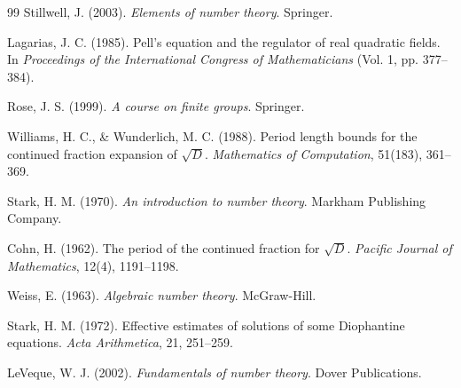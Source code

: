 \documentclass[12pt]{article}
\begin{document}
\begin{thebibliography}{99}
Stillwell, J. (2003). \emph{Elements of number theory}. Springer.

Lagarias, J. C. (1985). Pell's equation and the regulator of real quadratic fields. In \emph{Proceedings of the International Congress of Mathematicians} (Vol. 1, pp. 377--384).

Rose, J. S. (1999). \emph{A course on finite groups}. Springer.

Williams, H. C., \& Wunderlich, M. C. (1988). Period length bounds for the continued fraction expansion of $\sqrt{D}$. \emph{Mathematics of Computation}, 51(183), 361--369.

Stark, H. M. (1970). \emph{An introduction to number theory}. Markham Publishing Company.

Cohn, H. (1962). The period of the continued fraction for $\sqrt{D}$. \emph{Pacific Journal of Mathematics}, 12(4), 1191--1198.

Weiss, E. (1963). \emph{Algebraic number theory}. McGraw-Hill.

Stark, H. M. (1972). Effective estimates of solutions of some Diophantine equations. \emph{Acta Arithmetica}, 21, 251--259.

LeVeque, W. J. (2002). \emph{Fundamentals of number theory}. Dover Publications.

\end{thebibliography}
\end{document}
